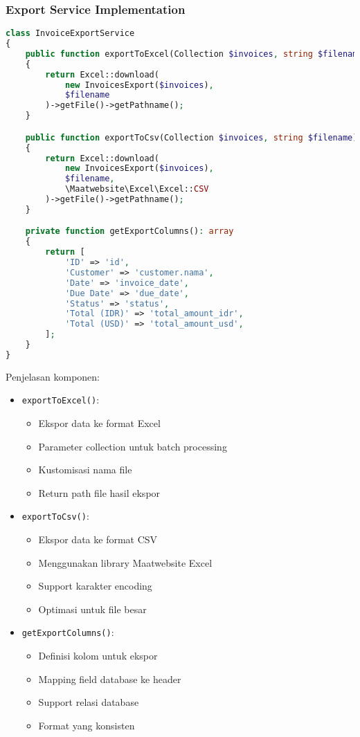 \documentclass[a4paper]{report}
\begin{document}
\subsubsection{Export Service Implementation}
\begin{lstlisting}[language=PHP]
class InvoiceExportService
{
    public function exportToExcel(Collection $invoices, string $filename): string
    {
        return Excel::download(
            new InvoicesExport($invoices),
            $filename
        )->getFile()->getPathname();
    }

    public function exportToCsv(Collection $invoices, string $filename): string
    {
        return Excel::download(
            new InvoicesExport($invoices),
            $filename,
            \Maatwebsite\Excel\Excel::CSV
        )->getFile()->getPathname();
    }

    private function getExportColumns(): array
    {
        return [
            'ID' => 'id',
            'Customer' => 'customer.nama',
            'Date' => 'invoice_date',
            'Due Date' => 'due_date',
            'Status' => 'status',
            'Total (IDR)' => 'total_amount_idr',
            'Total (USD)' => 'total_amount_usd',
        ];
    }
}
\end{lstlisting}

Penjelasan komponen:
\begin{itemize}
\item \texttt{exportToExcel()}:
    \begin{itemize}
    \item Ekspor data ke format Excel
    \item Parameter collection untuk batch processing
    \item Kustomisasi nama file
    \item Return path file hasil ekspor
    \end{itemize}

\item \texttt{exportToCsv()}:
    \begin{itemize}
    \item Ekspor data ke format CSV
    \item Menggunakan library Maatwebsite Excel
    \item Support karakter encoding
    \item Optimasi untuk file besar
    \end{itemize}

\item \texttt{getExportColumns()}:
    \begin{itemize}
    \item Definisi kolom untuk ekspor
    \item Mapping field database ke header
    \item Support relasi database
    \item Format yang konsisten
    \end{itemize}
\end{itemize}
\end{document}
